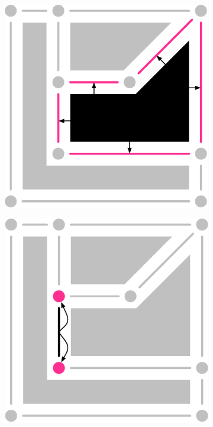 \begin{figure}
\centering
\begin{subfigure}[b]{0.27\linewidth}
\includegraphics[width=\linewidth]{figs/2-cell-boundary}
\caption{}%
\label{subfig:2-cell-boundary}
\end{subfigure}
\quad
\begin{subfigure}[b]{0.27\linewidth}
\includegraphics[width=\linewidth]{figs/1-cell-boundary}

\end{subfigure}
\end{figure}
